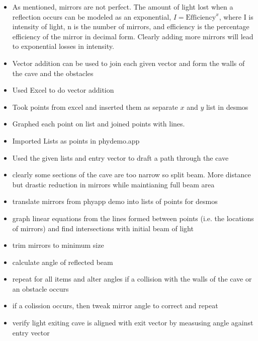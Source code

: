 \documentclass[11pt, letterpaper]{article}
\begin{document}
\begin{itemize}
	
\item	As mentioned, mirrors are not perfect. The amount of light lost when a reflection occurs can be modeled as an exponential, $I=\textrm{Efficiency}^x$, where I is intensity of light, n is the number of mirrors, and efficiency is the percentage efficiency of the mirror in decimal form. Clearly  adding more mirrors will lead to exponential losses in intensity.

\item Vector addition can be used to join each given vector and form the walls of the cave and the obstacles

\item Used Excel to do vector addition

\item Took points from excel and inserted them as separate $x$ and $y$ list in desmos

\item Graphed each point on list and joined points with lines.

\item Imported Lists as points in phydemo.app

\item Used the given lists and entry vector to draft a path through the cave

\item  clearly some sections of the cave are too narrow so split beam. More distance but drastic reduction in mirrors while maintianing full beam area

\item translate mirrors from phyapp demo into lists of points for desmos

\item graph linear equations from the lines formed between points (i.e. the locations of mirrors) and find intersections with initial beam of light

\item  trim mirrors to minimum size

\item calculate angle of reflected beam 

\item repeat for all items and alter angles if a collision with the walls of the cave or an obstacle occurs

\item if a colission occurs, then tweak mirror angle to correct and repeat

\item verify light exiting cave is aligned with exit vector by measusing angle against entry vector
\end{itemize}
\end{document}
